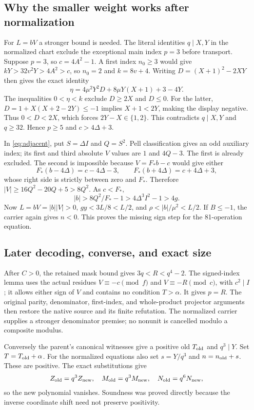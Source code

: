 \subsection{Why the smaller weight works after normalization}

For $L=bV$ a stronger bound is needed. The literal identities $q\mid X,Y$
in the normalized chart exclude the exceptional main index $p=3$ before
transport. Suppose $p=3$, so $c=4A^2-1$. A first index $n_0\ge3$ would
give $kY>32v^2Y>4A^2>c$, so $n_0=2$ and $k=8v+4$.
Writing $D=(X+1)^2-2XY$ then gives the exact identity
\[
 \eta=4\mu^2Y^2D+8\mu Y(X+1)+3-4Y.
\]
The inequalities $0<\eta<k$ exclude $D\ge2X$ and $D\le0$.
For the latter, $D=1+X(X+2-2Y)\le-1$ implies $X+1<2Y$, making the
display negative. Thus $0<D<2X$, which forces
$2Y-X\in\{1,2\}$. This contradicts $q\mid X,Y$ and $q\ge32$.
Hence $p\ge5$ and $c>4\Delta+3$.

In \eqref{eq:adjacent}, put $S=\Delta I$ and $Q=S^2$. Pell classification
gives an odd auxiliary index; its first and third absolute $V$ values
are $1$ and $4Q-3$. The first is already excluded. The second is
impossible because $V=F_*b-c$ would give either
\[
 F_*(b-4\Delta)=c-4\Delta-3,
 \qquad F_*(b+4\Delta)=c+4\Delta+3,
\]
whose right side is strictly between zero and $F_*$. Therefore
$|V|\ge16Q^2-20Q+5>8Q^2$. As $c<F_*$,
\[
 |b|>8Q^2/F_*-1>4\Delta^3I^2-1>4g.
\]
Now $L=bV=|b||V|>0$, $gy<3L/8<L/2$, and
$\rho<|b|/\mu^2<L/2$. If $B\le-1$, the carrier again gives $n<0$.
This proves the missing sign step for the 81-operation equation.

\subsection{Later decoding, converse, and exact size}

After $C>0$, the retained mask bound gives $3q<R<q^4-2$. The signed-index
lemma uses the actual residues $V\equiv-c\pmod f$ and
$V\equiv-R\pmod c$, with $c^2\mid I$; it allows either sign of $V$ and
contains no condition $T>\alpha$. It gives $p=R$. The original parity,
denominator, first-index, and whole-product projector arguments then
restore the native source and its finite refutation. The normalized
carrier supplies a stronger denominator premise; no nonunit is cancelled
modulo a composite modulus.

Conversely the parent's canonical witnesses give a positive old
$T_{\rm old}$ and $q^3\mid Y$. Set $T=T_{\rm old}+\alpha$. For the
normalized equations also set $s=Y/q^3$ and
$n=n_{\rm old}+s$. These are positive. The exact substitutions give
\[
 Z_{\rm old}=q^3Z_{\rm new},\quad
 M_{\rm old}=q^3M_{\rm new},\quad
 N_{\rm old}=q^6N_{\rm new},
\]
so the new polynomial vanishes. Soundness was proved directly because
the inverse coordinate shift need not preserve positivity.

